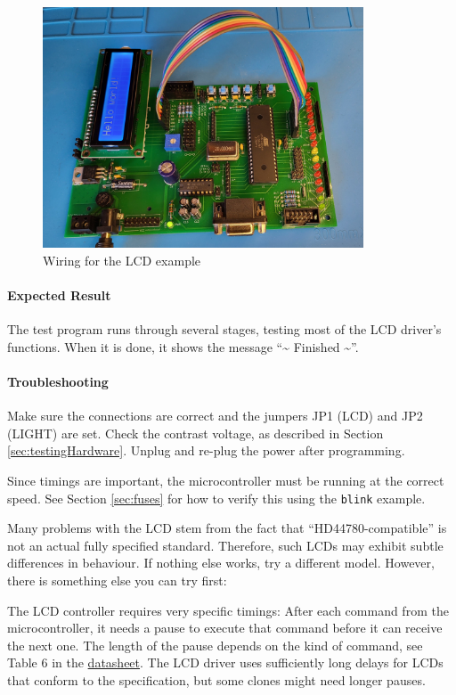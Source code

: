 \documentclass{article}
\begin{document}
\begin{figure}[htb]
\centering
\includegraphics[width=0.85\textwidth]{Pictures/WiringLCD.jpg}
\caption{Wiring for the LCD example}
\label{fig:wiringLCD}
\end{figure}

\paragraph{Expected Result}
The test program runs through several stages, testing most of the LCD driver's functions. When it is done, it shows the message ``\~{} Finished \~{}''. 

\paragraph{Troubleshooting}
Make sure the connections are correct and the jumpers JP1 (LCD) and JP2 (LIGHT) are set. Check the contrast voltage, as described in Section \ref{sec:testingHardware}. Unplug and re-plug the power after programming. 

Since timings are important, the microcontroller must be running at the correct speed. See Section \ref{sec:fuses} for how to verify this using the \texttt{blink} example. 

Many problems with the LCD stem from the fact that ``HD44780-compatible'' is not an actual fully specified standard. Therefore, such LCDs may exhibit subtle differences in behaviour. If nothing else works, try a different model. However, there is something else you can try first:

The LCD controller requires very specific timings: After each command from the microcontroller, it needs a pause to execute that command before it can receive the next one. The length of the pause depends on the kind of command, see Table 6 in the \href{https://cdn-shop.adafruit.com/datasheets/HD44780.pdf}{datasheet}. The LCD driver uses sufficiently long delays for LCDs that conform to the specification, but some clones might need longer pauses. 
\end{document}
